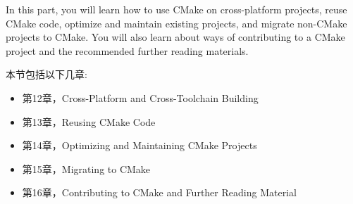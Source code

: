 In this part, you will learn how to use CMake on cross-platform projects, reuse CMake code, optimize and maintain existing projects, and migrate non-CMake projects to CMake. You will also learn about ways of contributing to a CMake project and the recommended further reading materials.

本节包括以下几章:

\begin{itemize}
\item 第12章，Cross-Platform and Cross-Toolchain Building
\item 第13章，Reusing CMake Code
\item 第14章，Optimizing and Maintaining CMake Projects
\item 第15章，Migrating to CMake
\item 第16章，Contributing to CMake and Further Reading Material
\end{itemize}